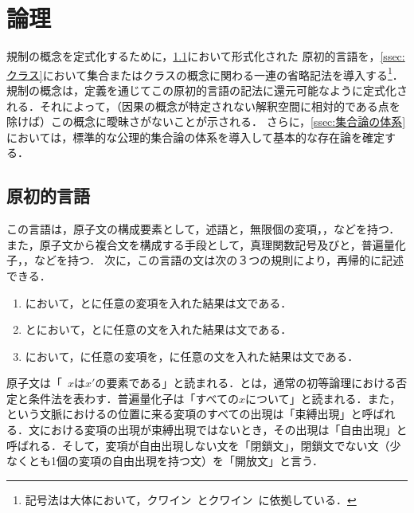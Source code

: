 
\section{論理}
\label{sec:論理}

規制の概念を定式化するために，\ref{ssec:原初的言語}において形式化された
原初的言語を，\ref{ssec:クラス}において集合またはクラスの概念に関わる一連の省略記法を導入する\footnote{記号法は大体において，クワイン~\cite{クワインa}とクワイン~\cite{クワインb}に依拠している．}．
規制の概念は，定義を通じてこの原初的言語の記法に還元可能なように定式化される．それによって，（因果の概念が特定されない解釈空間に相対的である点を除けば）この概念に曖昧さがないことが示される．
さらに，\ref{ssec:集合論の体系}においては，標準的な公理的集合論の体系を導入して基本的な存在論を確定する．

\subsection{原初的言語}
\label{ssec:原初的言語}

この言語は，原子文の構成要素として，述語\kagi{$\in$}と，無限個の変項，，などを持つ．
また，原子文から複合文を構成する手段として，真理関数記号\kagi{$\neg$}及び\kagi{$\supset$}と，普遍量化子，，などを持つ．
次に，この言語の文は次の３つの規則により，再帰的に記述できる．
\begin{enumerate}[label=(\arabic*)]
    \item \kagi{$\alpha\in\beta$}において，\kagi{$\alpha$}と\kagi{$\beta$}に任意の変項を入れた結果は文である．
    \item {}とにおいて，とに任意の文を入れた結果は文である．
    \item {}において，\kagi{$\alpha$}に任意の変項を，に任意の文を入れた結果は文である．
\end{enumerate}
原子文は「~$x$は$x'$の要素である」と読まれる．\kagi{$\neg$}と\kagi{$\supset$}は，通常の初等論理における否定と条件法を表わす．普遍量化子は「すべての$x$について」と読まれる．また，という文脈における\kagi{$\alpha$}の位置に来る変項のすべての出現は「束縛出現」と呼ばれる．文における変項の出現が束縛出現ではないとき，その出現は「自由出現」と呼ばれる．そして，変項が自由出現しない文を「閉鎖文」，閉鎖文でない文（少なくとも1個の変項の自由出現を持つ文）を「開放文」と言う．

